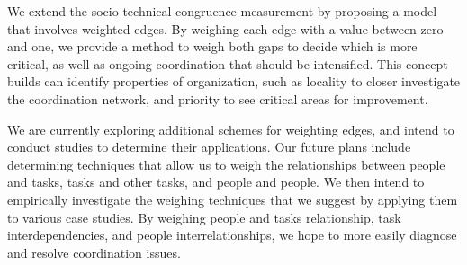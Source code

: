 \documentclass[times, 10pt,twocolumn]{article}
\begin{document}
\label{sec:conclusion}

We extend the socio-technical congruence measurement by proposing a model that involves weighted edges. 
By weighing each edge with a value between zero and one, we provide a method to weigh both gaps to decide which is more critical, as well as ongoing coordination that should be intensified.
This concept builds can identify properties of organization, such as locality to closer investigate the coordination network, and priority to see critical areas for improvement.

We are currently exploring additional schemes for weighting edges, and intend to conduct studies to determine their applications.
Our future plans include determining techniques that allow us to weigh the relationships between people and tasks, tasks and other tasks, and people and people.
We then intend to empirically investigate the weighing techniques that we suggest by applying them to various case studies.
By weighing people and tasks relationship, task interdependencies, and people interrelationships, we hope to more easily diagnose and resolve coordination issues.




\end{document}
